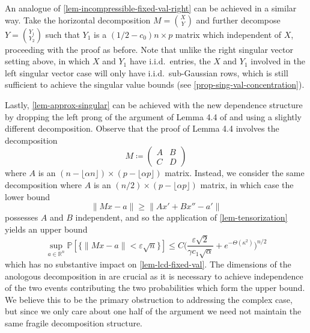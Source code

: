 \documentclass[11pt]{article}
\numberwithin{equation}{section}
\theoremstyle{remark}
\newcommand{\R}{\mathbb{R}}
\begin{document}
An analogue of \cref{lem-incompressible-fixed-val-right} can be achieved in a similar way. Take the horizontal decomposition $M = \binom{X}{Y}$ and further decompose $Y = \binom{Y_1}{Y_2}$ such that $Y_1$ is a $(1/2 - c_0)n \times p$ matrix which independent of $X$, proceeding with the proof as before. Note that unlike the right singular vector setting above, in which $X$ and $Y_1$ have i.i.d.\ entries, the $X$ and $Y_1$ involved in the left singular vector case will only have i.i.d.\ sub-Gaussian rows, which is still sufficient to achieve the singular value bounds (see \cref{prop-sing-val-concentration}).

Lastly, \cref{lem-approx-singular} can be achieved with the new dependence structure by dropping the left prong of the argument of Lemma 4.4 of \cite{christoffersen2025gaps} and using a slightly different decomposition. Observe that the proof of Lemma 4.4 involves the decomposition 
\begin{equation*}
    M \coloneqq         
    \begin{pmatrix}
        A & B \\
        C & D
    \end{pmatrix}
\end{equation*}
where $A$ is an $(n - \lfloor \alpha n \rfloor) \times (p - \lfloor \alpha p \rfloor)$ matrix. Instead, we consider the same decomposition where $A$ is an $(n/2) \times (p - \lfloor \alpha p \rfloor)$ matrix, in which case the lower bound 
\begin{equation*}
    \|Mx - a \| \geq \|Ax' + Bx'' - a' \|
\end{equation*}
possesses $A$ and $B$ independent, and so the application of \cref{lem-tensorization} yields an upper bound 
\begin{equation*}
    \sup_{a \in \R^n}\mathbb{P}[ \{\|Mx - a\| < \varepsilon \sqrt{n}\}] \leq C\bigg(\frac{\varepsilon\sqrt{2}}{\gamma c_{1} \sqrt{\alpha}} + e^{-\Theta(\kappa^2)} \bigg)^{n/2}
\end{equation*}
which has no substantive impact on \cref{lem-lcd-fixed-val}. The dimensions of the anologous decomposition in \cite{christoffersen2025gaps} are crucial as it is necessary to achieve independence of the two events contributing the two probabilities which form the upper bound. We believe this to be the primary obstruction to \cite{christoffersen2025gaps} addressing the complex case, but since we only care about one half of the argument we need not maintain the same fragile decomposition structure.
\end{document}
